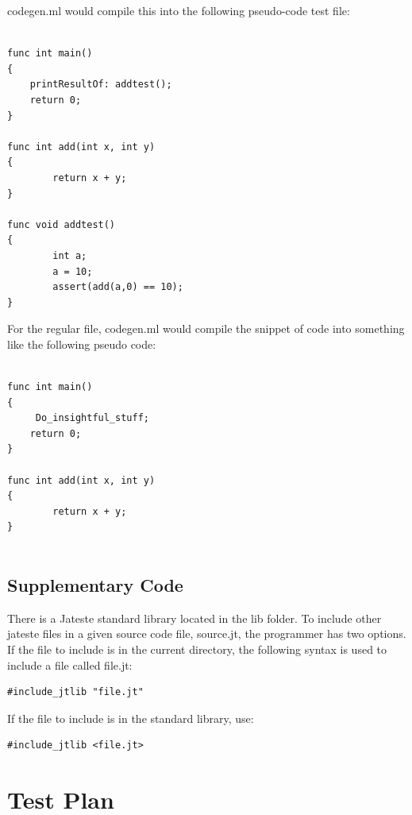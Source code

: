 \documentclass{article}
\begin{document}
codegen.ml would compile this into the following pseudo-code test file:

\begin{lstlisting}

func int main()
{
    printResultOf: addtest();
    return 0;
}

func int add(int x, int y)
{
        return x + y;
} 

func void addtest()
{
        int a;
        a = 10;
        assert(add(a,0) == 10);
}

\end{lstlisting}

For the regular file, codegen.ml would compile the snippet of code into something like the following pseudo code:

\begin{lstlisting}

func int main()
{
     Do_insightful_stuff;
    return 0;
}

func int add(int x, int y)
{
        return x + y;
} 


\end{lstlisting}


\subsection{Supplementary Code} %
There is a Jateste standard library located in the lib folder. To include other jateste files in a given source code file, source.jt, the programmer has two options. If the file to include is in the current directory, the following syntax is used to include a file called file.jt: 
\begin{lstlisting}
#include_jtlib "file.jt"
\end{lstlisting}
If the file to include is in the standard library, use:
\begin{lstlisting}
#include_jtlib <file.jt>
\end{lstlisting}


\newpage

\section{Test Plan}
\end{document}
